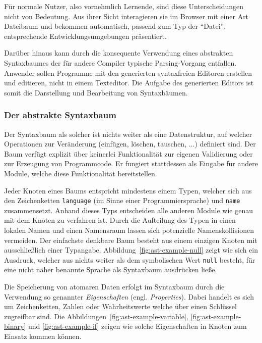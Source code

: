 \documentclass[paper=a4,fontsize=11pt,parskip=half]{scrartcl}
\begin{document}
Für normale Nutzer, also vornehmlich Lernende, sind diese Unterscheidungen nicht von Bedeutung. Aus ihrer Sicht interagieren sie im Browser mit einer Art Dateibaum und bekommen automatisch, passend zum Typ der \enquote{Datei}, entsprechende Entwicklungsumgebungen präsentiert.

Darüber hinaus kann durch die konsequente Verwendung eines abstrakten Syntaxbaumes der für andere Compiler typische Parsing-Vorgang entfallen. Anwender sollen Programme mit den generierten syntaxfreien Editoren erstellen und editieren, nicht in einem Texteditor. Die Aufgabe des generierten Editors ist somit die Darstellung und Bearbeitung von Syntaxbäumen.

\subsubsection{Der abstrakte Syntaxbaum}

Der Syntaxbaum als solcher ist nichts weiter als eine Datenstruktur, auf welcher Operationen zur Veränderung (einfügen, löschen, tauschen, ...) definiert sind. Der Baum verfügt explizit über keinerlei Funktionalität zur eigenen Validierung oder zur Erzeugung von Programmcode. Er fungiert stattdessen als Eingabe für andere Module, welche diese Funktionalität bereitstellen.

Jeder Knoten eines Baums entspricht mindestens einem Typen, welcher sich aus den Zeichenketten \texttt{language} (im Sinne einer Programmiersprache) und \texttt{name} zusammensetzt. Anhand dieses Typs entscheiden alle anderen Module wie genau mit dem Knoten zu verfahren ist. Durch die Aufteilung des Typen in einen lokalen Namen und einen Namensraum lassen sich potenzielle Namenskollisionen vermeiden. Der einfachste denkbare Baum besteht aus einem einzigen Knoten mit ausschließlich einer Typangabe. Abbildung~\ref{fig:ast-example-null} zeigt wie sich ein Ausdruck, welcher aus nichts weiter als dem symbolischen Wert \texttt{null} besteht, für eine nicht näher benannte Sprache als Syntaxbaum ausdrücken ließe.

Die Speicherung von atomaren Daten erfolgt im Syntaxbaum durch die Verwendung so genannter \textit{Eigenschaften} (engl. \textit{Properties}). Dabei handelt es sich um Zeichenketten, Zahlen oder Wahrheitswerte welche über einen Schlüssel zugreifbar sind. Die Abbildungen~\ref{fig:ast-example-variable}, \ref{fig:ast-example-binary} und \ref{fig:ast-example-if} zeigen wie solche Eigenschaften in Knoten zum Einsatz kommen können.
\end{document}
